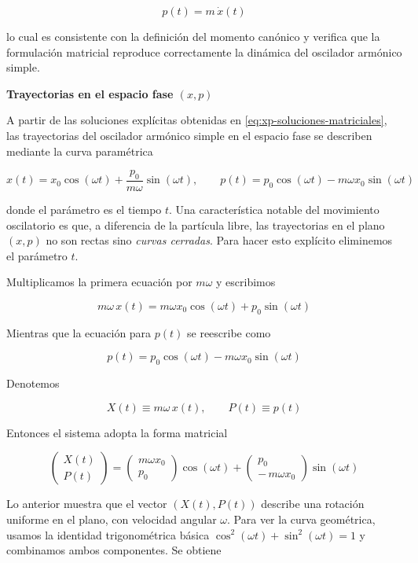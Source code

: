 \documentclass{article}
\begin{document}
\[
p(t) = m\,\dot{x}(t)
\]

lo cual es consistente con la definición del momento canónico y verifica que la
formulación matricial reproduce correctamente la dinámica del oscilador armónico
simple.

\vspace{0.4cm}
\textcolor{trueblue}{\textbf{Trayectorias en el espacio fase $(x,p)$}}

A partir de las soluciones explícitas obtenidas en \eqref{eq:xp-soluciones-matriciales},
las trayectorias del oscilador armónico simple en el espacio fase se describen
mediante la curva paramétrica

\[
x(t) = x_{0}\cos(\omega t) + \frac{p_{0}}{m\omega}\sin(\omega t),
\qquad
p(t) = p_{0}\cos(\omega t) - m\omega x_{0}\sin(\omega t)
\]

donde el parámetro es el tiempo $t$.  
Una característica notable del movimiento oscilatorio es que, a diferencia de la
partícula libre, las trayectorias en el plano $(x,p)$ no son rectas sino
\emph{curvas cerradas}. Para hacer esto explícito eliminemos el parámetro $t$.

Multiplicamos la primera ecuación por $m\omega$ y escribimos

\[
m\omega\,x(t)
= m\omega x_{0}\cos(\omega t)
  + p_{0}\sin(\omega t)
\]

Mientras que la ecuación para $p(t)$ se reescribe como

\[
p(t)
= p_{0}\cos(\omega t)
  - m\omega x_{0}\sin(\omega t)
\]

Denotemos

\[
X(t) \equiv m\omega\,x(t),
\qquad
P(t) \equiv p(t)
\]

Entonces el sistema adopta la forma matricial

\[
\begin{pmatrix}
X(t) \\[4pt]
P(t)
\end{pmatrix}
=
\begin{pmatrix}
m\omega x_{0} \\[4pt]
p_{0}
\end{pmatrix}
\cos(\omega t)
+
\begin{pmatrix}
p_{0} \\[4pt]
-\,m\omega x_{0}
\end{pmatrix}
\sin(\omega t)
\]

Lo anterior muestra que el vector $(X(t),P(t))$ describe una rotación uniforme
en el plano, con velocidad angular $\omega$.  
Para ver la curva geométrica, usamos la identidad trigonométrica básica
$\cos^{2}(\omega t)+\sin^{2}(\omega t)=1$ y combinamos ambos componentes. Se obtiene
\end{document}
